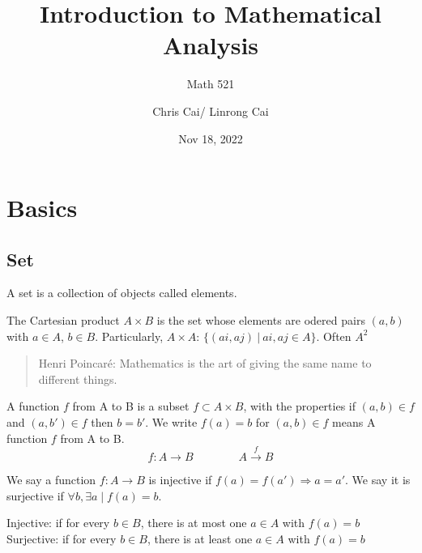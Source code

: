 \documentclass[11pt]{elegantbook}
\title{Introduction to Mathematical Analysis}
\subtitle{Math 521}
\author{Chris Cai/ Linrong Cai}
\institute{University of Wisconisn Madison}
\date{Nov 18, 2022}
\begin{document}
\maketitle

\frontmatter
\tableofcontents

\mainmatter
\chapter{Basics}

\section{Set}
\begin{definition}
    A set is a collection of objects called elements.
\end{definition}
\begin{definition}
    The Cartesian product $ A\times B $ is the set whose elements are odered pairs $(a, b)$ with $ a \in A $, $ b \in B $.
    Particularly, $ A \times A $: $\{(ai, aj) \ \vert \  ai, aj \in A \}$. Often $A^2$
\end{definition}

\begin{quotation}
    Henri Poincaré: Mathematics is the art of giving the same name to different things.
\end{quotation}

\begin{definition}
    A function $f$ from A to B is a subset $f \subset A \times B $, with the properties if $(a, b)\in f $ and $(a, b') \in f$ then $b = b'$.  We write $f(a)= b $ for $(a, b ) \in f $ means A function $f$ from A to B. 
    $$ f: A \rightarrow  B \qquad \qquad A \xrightarrow{f} B $$
\end{definition}

\begin{definition}
    We say a function $f: A \rightarrow B $ is injective if $f(a) = f(a') \Rightarrow a = a'$.
    We say it is surjective if $\forall  b, \exists a \mid f(a) = b$.
\end{definition}

\begin{corollary}
    Injective: if for every $b \in B $, there is at most one $a \in A$ with $f(a) = b $ \\
    Surjective: if for every $b \in B $, there is at least one $a \in A$ with $f(a) = b $
\end{corollary}
\end{document}
